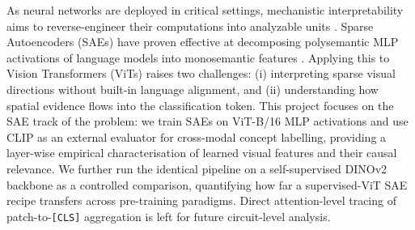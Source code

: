 As neural networks are deployed in critical settings, mechanistic interpretability aims to reverse-engineer their computations into analyzable units \cite{Elhage2021}. Sparse Autoencoders (SAEs) have proven effective at decomposing polysemantic MLP activations of language models into monosemantic features \cite{Cunningham2024, Bricken2023}. Applying this to Vision Transformers (ViTs) \cite{Dosovitskiy2021} raises two challenges: (i) interpreting sparse visual directions without built-in language alignment, and (ii) understanding how spatial evidence flows into the classification token. This project focuses on the SAE track of the problem: we train SAEs on ViT-B/16 MLP activations and use CLIP \cite{Radford2021} as an external evaluator for cross-modal concept labelling, providing a layer-wise empirical characterisation of learned visual features and their causal relevance. We further run the identical pipeline on a self-supervised DINOv2 backbone \cite{Caron2021} as a controlled comparison, quantifying how far a supervised-ViT SAE recipe transfers across pre-training paradigms. Direct attention-level tracing of patch-to-\texttt{[CLS]} aggregation is left for future circuit-level analysis.
